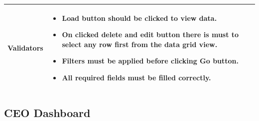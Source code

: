 \documentclass[12pt,a4paper]{article}
\begin{document}
\begin{longtable}{| p{3cm}|p{12cm}|}
Validators & 
\begin{itemize}
\item Load button should be clicked to view data.
\item   On clicked delete and edit button there is must to select any row first from the data grid view. 
\item  Filters must be applied before clicking Go button.
\item All required fields must be filled correctly. 

\end{itemize}
\\ \hline

\end{longtable}
\subsection{CEO Dashboard }
\end{document}
